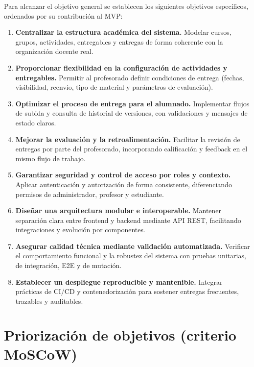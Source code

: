 Para alcanzar el objetivo general se establecen los siguientes objetivos espec\'ificos,
ordenados por su contribuci\'on al MVP:

\begin{enumerate}
	\item \textbf{Centralizar la estructura acad\'emica del sistema.}
	Modelar cursos, grupos, actividades, entregables y entregas de forma coherente
	con la organizaci\'on docente real.

	\item \textbf{Proporcionar flexibilidad en la configuraci\'on de actividades y entregables.}
	Permitir al profesorado definir condiciones de entrega (fechas, visibilidad,
	reenv\'io, tipo de material y par\'ametros de evaluaci\'on).

	\item \textbf{Optimizar el proceso de entrega para el alumnado.}
	Implementar flujos de subida y consulta de historial de versiones,
	con validaciones y mensajes de estado claros.

	\item \textbf{Mejorar la evaluaci\'on y la retroalimentaci\'on.}
	Facilitar la revisi\'on de entregas por parte del profesorado,
	incorporando calificaci\'on y feedback en el mismo flujo de trabajo.

	\item \textbf{Garantizar seguridad y control de acceso por roles y contexto.}
	Aplicar autenticaci\'on y autorizaci\'on de forma consistente,
	diferenciando permisos de administrador, profesor y estudiante.

	\item \textbf{Dise\~nar una arquitectura modular e interoperable.}
	Mantener separaci\'on clara entre frontend y backend mediante API REST,
	facilitando integraciones y evoluci\'on por componentes.

	\item \textbf{Asegurar calidad t\'ecnica mediante validaci\'on automatizada.}
	Verificar el comportamiento funcional y la robustez del sistema
	con pruebas unitarias, de integraci\'on, E2E y de mutaci\'on.

	\item \textbf{Establecer un despliegue reproducible y mantenible.}
	Integrar pr\'acticas de CI/CD y contenedorizaci\'on para sostener
	entregas frecuentes, trazables y auditables.
\end{enumerate}

\FloatBarrier
\section{Priorizaci\'on de objetivos (criterio MoSCoW)}

